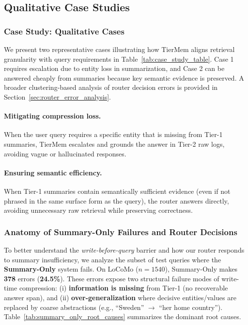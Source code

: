 \documentclass{article}
\theoremstyle{plain}
\theoremstyle{definition}
\theoremstyle{remark}
\begin{document}
\subsection{Qualitative Case Studies}
\label{sec:case_study}
\subsubsection{Case Study: Qualitative Cases}
We present two representative cases illustrating how TierMem aligns retrieval granularity with query requirements in Table~\ref{tab:case_study_table}.
Case 1 requires escalation due to entity loss in summarization, and Case 2 can be answered cheaply from summaries because key semantic evidence is preserved. A broader clustering-based analysis of router decision errors is provided in Section~\ref{sec:router_error_analysis}.


\paragraph{Mitigating compression loss.}
When the user query requires a specific entity that is missing from Tier-1 summaries, TierMem escalates and grounds the answer in Tier-2 raw logs, avoiding vague or hallucinated responses.

\paragraph{Ensuring semantic efficiency.}
When Tier-1 summaries contain semantically sufficient evidence (even if not phrased in the same surface form as the query), the router answers directly, avoiding unnecessary raw retrieval while preserving correctness.

\subsubsection{Anatomy of Summary-Only Failures and Router Decisions}
\label{sec:summary_failures_router}

To better understand the \emph{write-before-query} barrier and how our router responds to summary insufficiency, we analyze the subset of test queries where the \textbf{Summary-Only} system fails.
On LoCoMo ($n{=}1540$), Summary-Only makes \textbf{378} errors (\textbf{24.5\%}).
These errors expose two structural failure modes of write-time compression:
(i) \textbf{information is missing} from Tier-1 (no recoverable answer span), and
(ii) \textbf{over-generalization} where decisive entities/values are replaced by coarse abstractions (e.g., ``Sweden'' $\rightarrow$ ``her home country'').
Table~\ref{tab:summary_only_root_causes} summarizes the dominant root causes.
\end{document}
